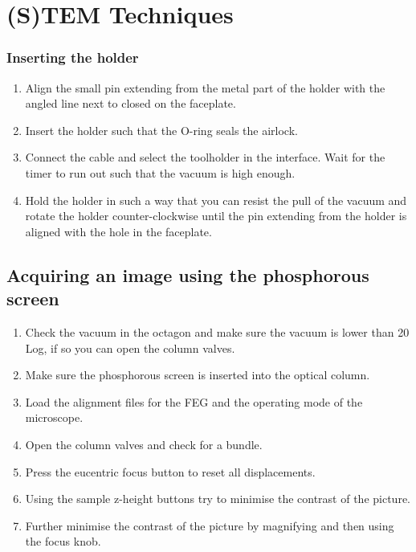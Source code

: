 \documentclass[a4paper]{scrartcl}
\begin{document}
\section*{(S)TEM  Techniques}

\subsubsection*{Inserting the holder}
\begin{enumerate}
	\item Align the small pin extending from the metal part of the holder with the angled line next to closed on the faceplate.
	\item Insert the holder such that the O-ring seals the airlock.
	\item Connect the cable and select the toolholder in the interface. Wait for the timer to run out such that the vacuum is high enough.
	\item Hold the holder in such a way that you can resist the pull of the vacuum and rotate the holder counter-clockwise until the pin extending from the holder is aligned with the hole in the faceplate.
\end{enumerate}


\subsection*{Acquiring an image using the phosphorous screen}
\begin{enumerate}
	\item Check the vacuum in the octagon and make sure the vacuum is lower than 20 Log, if so you can open the column valves.
	\item Make sure the phosphorous screen is inserted into the optical column.
	\item Load the alignment files for the FEG and the operating mode of the microscope.
	\item Open the column valves and check for a bundle.
	\item Press the eucentric focus button to reset all displacements.
	\item Using the sample z-height buttons try to minimise the contrast of the picture.
	\item Further minimise the contrast of the picture by magnifying and then using the focus knob.
\end{enumerate}
\end{document}
